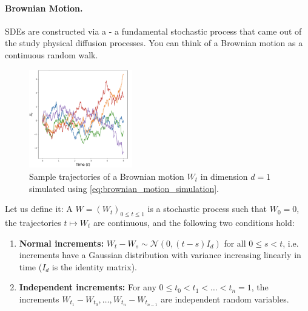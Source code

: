 \paragraph{Brownian Motion.} SDEs are constructed via a  - a fundamental stochastic process that came out of the study physical diffusion processes. You can think of a Brownian motion as a continuous random walk.
\begin{figure}
\includegraphics[width=0.4\textwidth]{figures/brownian_motion_sample_paths.png}
  \vspace{-20pt}
  \caption{Sample trajectories of a Brownian motion $W_t$ in dimension $d=1$ simulated using \cref{eq:brownian_motion_simulation}.}
  \label{fig:brownian_motion_trajectories}
  \vspace{-10pt}
\end{figure}
Let us define it: A  $W = (W_t)_{0\leq t\leq 1}$ is a stochastic process such that $W_0=0$, the trajectories $t\mapsto W_t$ are continuous, and the following two conditions hold:
\begin{enumerate}
    \item \textbf{Normal increments: }$W_{t}-W_{s}\sim \mathcal{N}(0,(t-s)I_d)$ for all $0\leq s<t$, i.e. increments have a Gaussian distribution with variance increasing linearly in time ($I_d$ is the identity matrix).
    \item \textbf{Independent increments: }For any $0\leq t_0<t_1<\dots <t_n=1$, the increments $W_{t_1}-W_{t_0},\dots,W_{t_n}-W_{t_{n-1}}$ are independent random variables.
\end{enumerate}

